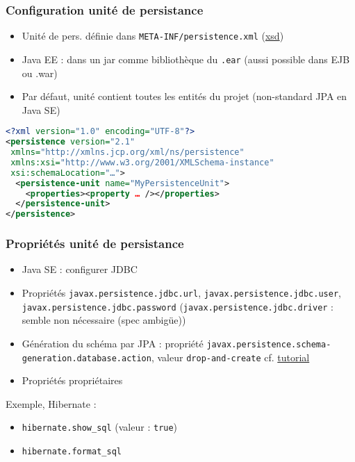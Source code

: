 \documentclass[english, french]{beamer}
\begin{document}
\begin{frame}[fragile]
	\frametitle{Configuration unité de persistance}
	\begin{itemize}
		\item Unité de pers. définie dans \texttt{META-INF/persistence.xml} {\tiny (\href{http://xmlns.jcp.org/xml/ns/persistence/persistence_2_1.xsd}{xsd})}
		\item Java EE : dans un jar comme bibliothèque du \texttt{.ear} {\tiny (aussi possible dans EJB ou .war)}
		\item Par défaut, unité contient toutes les entités du projet {\tiny (non-standard JPA en Java SE)}
	\end{itemize}
	\begin{lstlisting}[language = XML]
<?xml version="1.0" encoding="UTF-8"?>
<persistence version="2.1"
 xmlns="http://xmlns.jcp.org/xml/ns/persistence"
 xmlns:xsi="http://www.w3.org/2001/XMLSchema-instance"	
 xsi:schemaLocation="…">
  <persistence-unit name="MyPersistenceUnit">
    <properties><property … /></properties>
  </persistence-unit>
</persistence>
	\end{lstlisting}
\end{frame}

\begin{frame}
	\frametitle{Propriétés unité de persistance}
	\begin{itemize}
		\item Java SE : configurer JDBC
		\item Propriétés \texttt{javax.persistence.jdbc.url}, \texttt{javax.persistence.jdbc.user}, \texttt{javax.persistence.jdbc.password} {\tiny (\texttt{javax.persistence.jdbc.driver} : semble non nécessaire (spec ambigüe))}
		\item Génération du schéma par JPA : propriété {\small\texttt{javax.persistence.schema-generation.database.action}}, valeur {\small\texttt{drop-and-create}} {\tiny cf. \href{https://docs.oracle.com/javaee/7/tutorial/persistence-intro005.htm}{tutorial}}
		\item Propriétés propriétaires
	\end{itemize}
Exemple, Hibernate :
	\begin{itemize}
		\item \texttt{hibernate.show\_sql} (valeur : \texttt{true})
		\item \texttt{hibernate.format\_sql}
	\end{itemize}
\end{frame}
\end{document}
